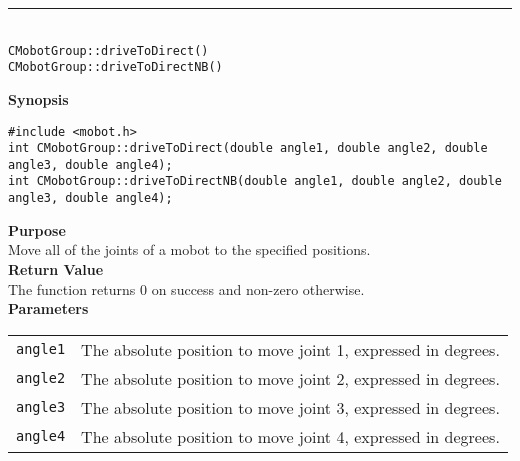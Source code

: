 \noindent
\vspace{5pt}
\rule{4.5in}{0.015in}\\
\noindent
{\LARGE \texttt{CMobotGroup::driveToDirect()}}\\
{\LARGE \texttt{CMobotGroup::driveToDirectNB()}}\\
{}

\noindent
{\bf Synopsis}
\vspace{-8pt}
\begin{verbatim}
#include <mobot.h>
int CMobotGroup::driveToDirect(double angle1, double angle2, double angle3, double angle4);
int CMobotGroup::driveToDirectNB(double angle1, double angle2, double angle3, double angle4);
\end{verbatim}

\noindent
{\bf Purpose}\\
Move all of the joints of a mobot to the specified positions.\\

\noindent
{\bf Return Value}\\
The function returns 0 on success and non-zero otherwise.\\

\noindent
{\bf Parameters}\\
\vspace{-0.1in}
\begin{description}
\item               
\begin{tabular}{p{15 mm}p{105 mm}}
\texttt{angle1} & The absolute position to move joint 1, expressed in degrees. \\
\texttt{angle2} & The absolute position to move joint 2, expressed in degrees. \\
\texttt{angle3} & The absolute position to move joint 3, expressed in degrees. \\
\texttt{angle4} & The absolute position to move joint 4, expressed in degrees. \\
\end{tabular}
\end{description}
\noindent

